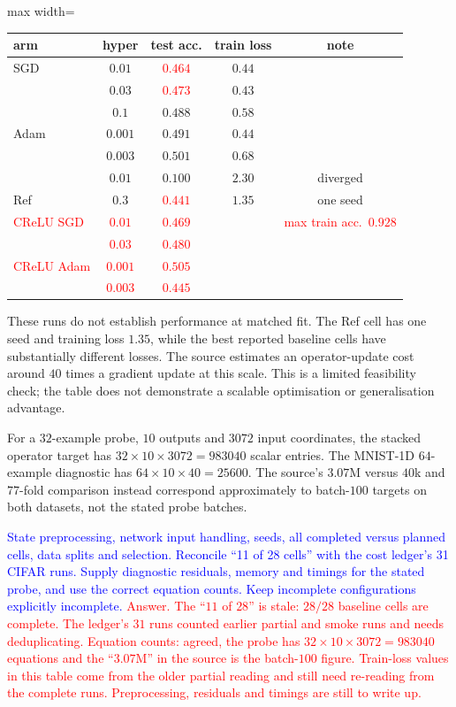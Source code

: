 \documentclass{article}
\newcommand{\zied}[1]{\textcolor{blue}{#1}}
\newcommand{\nat}[1]{\textcolor{red}{#1}}
\theoremstyle{definition}
\theoremstyle{remark}
\begin{document}
\begin{center}\small
\begin{adjustbox}{max width=\linewidth}
\begin{tabular}{lcccc}
\toprule
arm & hyper & test acc. & train loss & note \\
\midrule
SGD & $0.01$  & \nat{$0.464$} & $0.44$ & \\
                 & $0.03$  & \nat{$0.473$} & $0.43$ & \\
                 & $0.1$   & $0.488$ & $0.58$ & \\
Adam             & $0.001$ & $0.491$ & $0.44$ & \\
                 & $0.003$ & $0.501$ & $0.68$ & \\
                 & $0.01$  & $0.100$ & $2.30$ & diverged \\
Ref        & $0.3$   & \nat{$0.441$} & $1.35$ & one seed \\
\midrule
\nat{CReLU SGD} & \nat{$0.01$} & \nat{$0.469$} & & \nat{max train acc.\ $0.928$} \\
 & \nat{$0.03$} & \nat{$0.480$} & & \\
\nat{CReLU Adam} & \nat{$0.001$} & \nat{$\mathbf{0.505}$} & & \\
 & \nat{$0.003$} & \nat{$0.445$} & & \\
\bottomrule
\end{tabular}
\end{adjustbox}
\end{center}

These runs do not establish performance at matched fit. The Ref cell has one seed and training loss $1.35$, while the best reported baseline cells have substantially different losses. The source estimates an operator-update cost around $40$ times a gradient update at this scale. This is a limited feasibility check; the table does not demonstrate a scalable optimisation or generalisation advantage.

For a $32$-example probe, $10$ outputs and $3072$ input coordinates, the stacked operator target has $32\times10\times3072=983040$ scalar entries. The MNIST-1D $64$-example diagnostic has $64\times10\times40=25600$. The source's $3.07$M versus $40$k and $77$-fold comparison instead correspond approximately to batch-$100$ targets on both datasets, not the stated probe batches.

\zied{State preprocessing, network input handling, seeds, all completed versus planned cells, data splits and selection. Reconcile ``11 of 28 cells'' with the cost ledger's 31 CIFAR runs. Supply diagnostic residuals, memory and timings for the stated probe, and use the correct equation counts. Keep incomplete configurations explicitly incomplete.}
\nat{Answer. The ``$11$ of $28$'' is stale: $28/28$ baseline cells are complete. The ledger's $31$ runs counted earlier partial and smoke runs and needs deduplicating. Equation counts: agreed, the probe has $32\times10\times3072=983040$ equations and the ``$3.07$M'' in the source is the batch-$100$ figure. Train-loss values in this table come from the older partial reading and still need re-reading from the complete runs. Preprocessing, residuals and timings are still to write up.}
\end{document}
